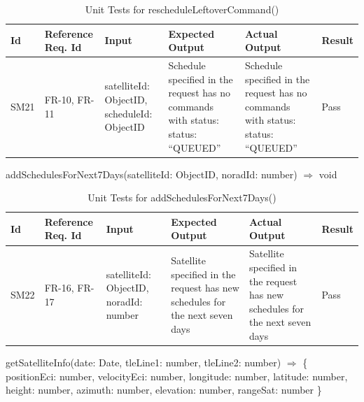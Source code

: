 \documentclass[12pt, titlepage]{article}
\begin{document}
\begin{center}
\begin{longtable}{|p{1cm} | p{2cm} |p{2cm}| p{2cm} |p{2cm}| p{2cm}|}
\caption{Unit Tests for rescheduleLeftoverCommand()}
\hline
\textbf{Id} & \textbf{Reference Req. Id} & \textbf{Input} & \textbf{Expected Output} & \textbf{Actual Output} & \textbf{Result} \\
\hline
SM21 & FR-10, FR-11 & { satelliteId: ObjectID,
scheduleId: ObjectID } & Schedule specified in the request has no commands with status:
 {status: “QUEUED”}
 & Schedule specified in the request has no commands with status:
 {status: “QUEUED”} & Pass
\\
\hline

\end{longtable}

\end{center}

addSchedulesForNext7Days(satelliteId: ObjectID, noradId: number) $\Rightarrow$ void

\begin{center}
\begin{longtable}{|p{1cm} | p{2cm} |p{2cm}| p{2cm} |p{2cm}| p{2cm}|}
\caption{Unit Tests for addSchedulesForNext7Days()}
\hline
\textbf{Id} & \textbf{Reference Req. Id} & \textbf{Input} & \textbf{Expected Output} & \textbf{Actual Output} & \textbf{Result} \\
\hline
SM22 & FR-16, FR-17 & { satelliteId: ObjectID,
noradId: number } & Satellite specified in the request has new schedules for the next seven days
 & Satellite specified in the request has new schedules for the next seven days & Pass
\\
\hline

\end{longtable}

\end{center}

getSatelliteInfo(date: Date, tleLine1: number, tleLine2: number) $\Rightarrow$ \{
    positionEci: number,
    velocityEci: number,
    longitude: number,
    latitude: number,
    height: number,
    azimuth: number,
    elevation: number,
    rangeSat: number
  \}
\end{document}
